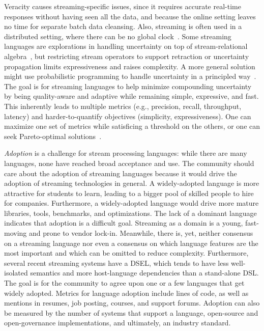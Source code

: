 Veracity causes streaming-specific issues, since it requires accurate
real-time responses without having seen all the data, and because the
online setting leaves no time for separate batch data cleansing. Also,
streaming is often used in a distributed setting, where there can be
no global clock~\cite{lamport_1978}. Some streaming languages are
explorations in handling uncertainty on top of stream-relational
algebra~\cite{tran_et_al_2010}, but restricting stream
operators to support retraction or uncertainty propagation limits
expressiveness and raises complexity. A more general solution might use
probabilistic programming to handle uncertainty in a principled
way~\cite{gordon_et_al_2014}. The goal is for streaming languages to help minimize compounding
uncertainty by being quality-aware and adaptive while remaining
simple, expressive, and fast. This inherently leads to multiple
metrics (e.g., precision, recall, throughput, latency) and
harder-to-quantify objectives (simplicity, expressiveness). One can
maximize one set of metrics while satisficing a threshold on the
others, or one can seek Pareto-optimal
solutions~\cite{zhang_hirzel_grove_2016}.

\emph{Adoption} is a challenge for stream processing languages: while
there are many languages, none have reached broad acceptance and use.
The community should care about the adoption of streaming languages
because it would drive the adoption of streaming technologies in general.
A widely-adopted language is more attractive for students to learn,
leading to a bigger pool of skilled people to hire for companies.
Furthermore, a widely-adopted language would drive more
mature libraries, tools, benchmarks, and optimizations. The lack of a
dominant language indicates that adoption is a difficult goal. Streaming as a domain is a young, fast-moving and prone to vendor
lock-in. Meanwhile, there is, yet, neither consensus on a
streaming language nor even a consensus on which language
features are the most important and which can be omitted to reduce
complexity. Furthermore, several recent streaming systems have a DSEL,
which tends to have less well-isolated semantics and more
host-language dependencies than a stand-alone DSL. The goal is for the community to agree upon one or a few languages that get
widely adopted. Metrics for language adoption include lines of code,
as well as mentions in resumes, job posting, courses, and support
forums. Adoption can also be measured by the number of systems that
support a language, open-source and open-governance implementations,
and ultimately, an industry standard.
\iffalse
We hope this summary of our working group discussion helps guide
future streaming-language research in novel and impactful directions.
\fi 